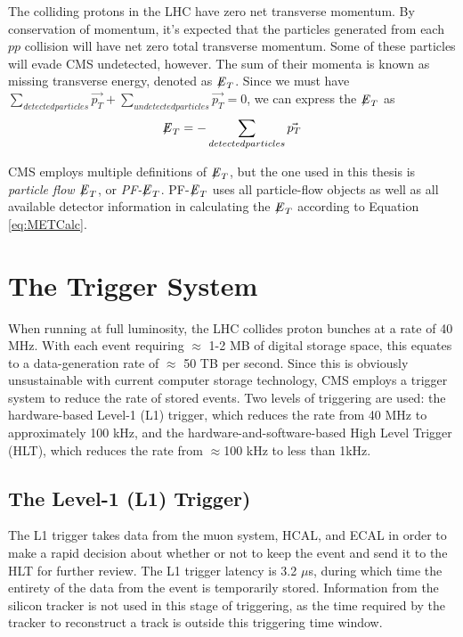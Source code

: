 The colliding protons in the LHC have zero net transverse momentum. By conservation of momentum, it's expected that the particles generated from each $pp$ collision will have net zero total transverse momentum. Some of these particles will evade CMS undetected, however. The sum of their momenta is known as missing transverse energy, denoted as ${\not\mathrel{E}}_T$. Since we must have $\sum_{detected particles} \vec{p_T} + \sum_{undetected particles} \vec{p_T} = 0$, we can express the ${\not\mathrel{E}}_T$ as
\begin{equation} \label{eq:METCalc}
{\not\mathrel{E}}_T = - \sum_{detected particles} \vec{p_T}
\end{equation}

CMS employs multiple definitions of ${\not\mathrel{E}}_T$, but the one used in this thesis is \textit{particle flow ${\not\mathrel{E}}_T$}, or \textit{PF-${\not\mathrel{E}}_T$}. PF-${\not\mathrel{E}}_T$ uses all particle-flow objects as well as all available detector information in calculating the ${\not\mathrel{E}}_T$ according to Equation \ref{eq:METCalc}.


\section{The Trigger System}

When running at full luminosity, the LHC collides proton bunches at a rate of 40 MHz. With each event requiring $\approx$ 1-2 MB of digital storage space, this equates to a data-generation rate of $\approx$ 50 TB per second. Since this is obviously unsustainable with current computer storage technology, CMS employs a trigger system to reduce the rate of stored events. Two levels of triggering are used: the hardware-based Level-1 (L1) trigger, which reduces the rate from 40 MHz to approximately 100 kHz, and the hardware-and-software-based High Level Trigger (HLT), which reduces the rate from $\approx$100 kHz to less than 1kHz\cite{TDR}.

\subsection{The Level-1 (L1) Trigger)}

The L1 trigger takes data from the muon system, HCAL, and ECAL in order to make a rapid decision about whether or not to keep the event and send it to the HLT for further review. The L1 trigger latency is 3.2 $\mu$s, during which time the entirety of the data from the event is temporarily stored. Information from the silicon tracker is not used in this stage of triggering, as the time required by the tracker to reconstruct a track is outside this triggering time window. 

